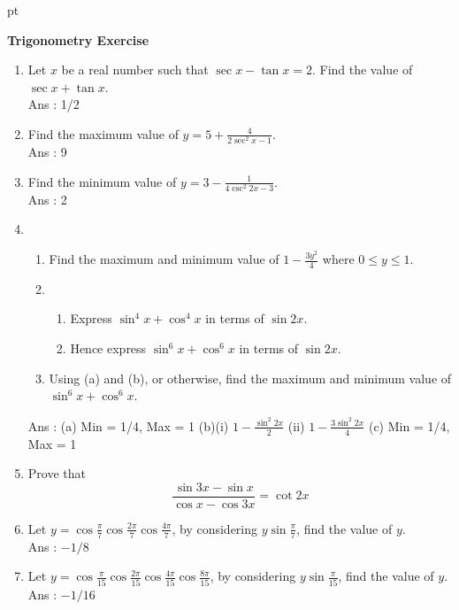 \documentclass[12pt]{article}
\begin{document}
 pt
\begin{center}
	{\large \bf Trigonometry Exercise}\\
	\vspace{2 mm}

\end{center}
\vspace{0.05cm}

\begin{enumerate}
	\item Let $x$ be a real number such that $\sec{x} - \tan{x} = 2$. Find the value of $\sec{x} + \tan{x}$.\\Ans : 1/2\newpage
	\item Find the maximum value of $y = 5 + \displaystyle\frac{4}{2\sec^2{x}-1}$.\\Ans : 9\newpage
	\item Find the minimum value of $y = 3 - \displaystyle\frac{1}{4\csc^2{2x}-3}$.\\Ans : 2\newpage
	\item 
	\begin{enumerate}
		\item Find the maximum and minimum value of $1- \displaystyle\frac{3y^2}{4}$ where $0 \leq y \leq 1$.
		\item 
		\begin{enumerate}
			\item Express $\sin^4{x} + \cos^4{x}$ in terms of $\sin{2x}$.
			\item Hence express $\sin^6{x} + \cos^6{x}$ in terms of $\sin{2x}$.
		\end{enumerate}
		\item Using (a) and (b), or otherwise, find the maximum and minimum value of $\sin^6{x} + \cos^6{x}$.
	\end{enumerate}
	Ans : (a) Min = 1/4, Max = 1 (b)(i) $1-\displaystyle\frac{\sin^2{2x}}{2}$ (ii) $1-\displaystyle\frac{3\sin^2{2x}}{4}$ (c) Min = 1/4, Max = 1\newpage
	\item Prove that $$\displaystyle\frac{\sin{3x} - \sin{x}}{\cos{x} - \cos{3x}} = \cot{2x}$$ \newpage
	\item Let $y = \displaystyle\cos{\frac{\pi}{7}}\cos{\frac{2\pi}{7}}\cos{\frac{4\pi}{7}}$, by considering $\displaystyle y\sin{\frac{\pi}{7}}$, find the value of $y$.\\Ans : $-1/8$\newpage
	\item Let $y = \displaystyle\cos{\frac{\pi}{15}}\cos{\frac{2\pi}{15}}\cos{\frac{4\pi}{15}}\cos{\frac{8\pi}{15}}$, by considering $\displaystyle y\sin{\frac{\pi}{15}}$, find the value of $y$.\\Ans : $-1/16$\newpage

\end{enumerate}
\end{document}
